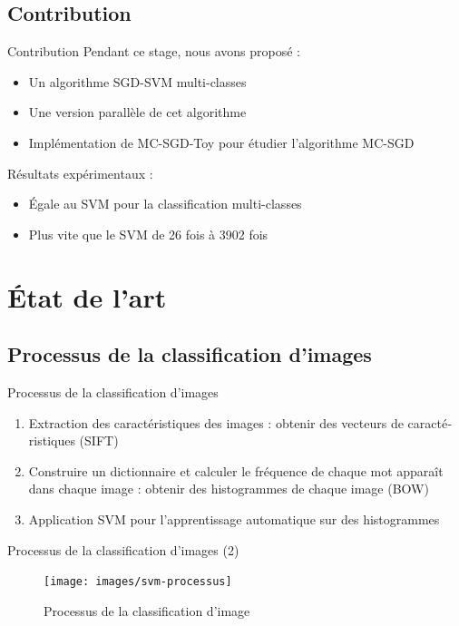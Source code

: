 \documentclass[11pt]{beamer}
\begin{document}
\begin{otherlanguage}{french}
\subsection{Contribution}
\begin{frame}{Contribution}
Pendant ce stage, nous avons proposé :
\begin{itemize}
\pause
\item Un algorithme SGD-SVM multi-classes
\pause
\item Une version parallèle de cet algorithme
\pause
\item Implémentation de MC-SGD-Toy pour étudier l'algorithme MC-SGD
\end{itemize}
\pause
Résultats expérimentaux :
\begin{itemize}
\item Égale au SVM pour la classification multi-classes
\item Plus vite que le SVM de 26 fois à 3902 fois
\end{itemize}
\end{frame}


\section{État de l'art}
\subsection{Processus de la classification d'images}
\begin{frame}{Processus de la classification d'images}
\begin{enumerate}
\pause
\item Extraction des caractéristiques des images : obtenir des vecteurs de caractéristiques (SIFT)
\pause
\item Construire un dictionnaire et calculer le fréquence de chaque mot apparaît dans chaque image : obtenir des histogrammes de chaque image (BOW)
\pause
\item Application SVM pour l'apprentissage automatique sur des histogrammes
\end{enumerate}
\end{frame}


\begin{frame}{Processus de la classification d'images (2)}
\begin{figure}[ht!]
\centering
\texttt{[image: images/svm-processus]}
\caption{Processus de la classification d'image}
\vspace{-2.0em}
\label{fig:processussvm}
\end{figure}
\end{frame}


\end{otherlanguage}
\end{document}
